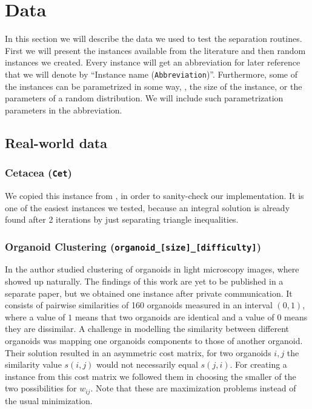\section{Data}\label{sec:data}
In this section we will describe the data we used to test the separation routines.
First we will present the instances available from the literature and then random instances we created.
Every instance will get an abbreviation for later reference that we will denote by “Instance name (\texttt{Abbreviation})”.
Furthermore, some of the instances can be parametrized in some way, \eg, the size of the instance, or the parameters of a random distribution.
We will include such parametrization parameters in the abbreviation.

\subsection{Real-world data}
\subsubsection{Cetacea (\texttt{Cet})}\label{subsubsec:data_cetacea}
We copied this instance from \cite{grotschelCuttingPlaneAlgorithm1989}, in order to sanity-check our implementation.
It is one of the easiest instances we tested, because an integral solution is already found after 2 iterations by just separating triangle inequalities.

\subsubsection{Organoid Clustering (\texttt{organoid\_[size]\_[difficulty]})}
In \cite{presbergerSegmentationClusteringOrganoids2023} the author studied clustering of organoids in light microscopy images, where \CP showed up naturally.
The findings of this work are yet to be published in a separate paper, but we obtained one instance after private communication.
It consists of pairwise similarities of 160 organoids measured in an interval $(0,1)$, where a value of $1$ means that two organoids are identical and a value of $0$ means they are dissimilar.
A challenge in modelling the similarity between different organoids was mapping one organoids components to those of another organoid.
Their solution resulted in an asymmetric cost matrix, \ie for two organoids $i, j$ the similarity value $s(i,j)$ would not necessarily equal $s(j,i)$.
For creating a \CP instance from this cost matrix we followed them in choosing the smaller of the two possibilities for $w_{ij}$.
Note that these are maximization problems instead of the usual minimization.

